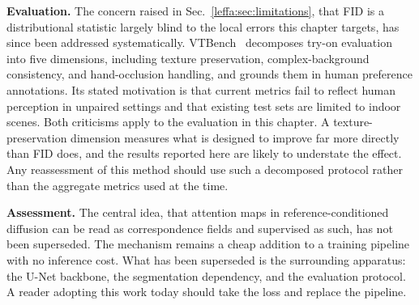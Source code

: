 \noindent \textbf{Evaluation.}
The concern raised in Sec.~\ref{leffa:sec:limitations}, that FID is a distributional statistic largely blind to the local errors this chapter targets, has since been addressed systematically. VTBench~\citep{hu2025vtbench} decomposes try-on evaluation into five dimensions, including texture preservation, complex-background consistency, and hand-occlusion handling, and grounds them in human preference annotations. Its stated motivation is that current metrics fail to reflect human perception in unpaired settings and that existing test sets are limited to indoor scenes. Both criticisms apply to the evaluation in this chapter. A texture-preservation dimension measures what \leffa{} is designed to improve far more directly than FID does, and the results reported here are likely to understate the effect. Any reassessment of this method should use such a decomposed protocol rather than the aggregate metrics used at the time.

\noindent \textbf{Assessment.}
The central idea, that attention maps in reference-conditioned diffusion can be read as correspondence fields and supervised as such, has not been superseded. The mechanism remains a cheap addition to a training pipeline with no inference cost. What has been superseded is the surrounding apparatus: the U-Net backbone, the segmentation dependency, and the evaluation protocol. A reader adopting this work today should take the loss and replace the pipeline.
